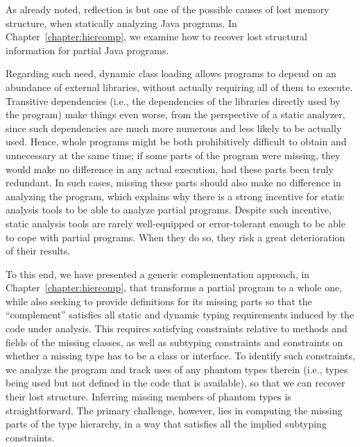 As already noted, reflection is but one of the possible causes of lost
memory structure, when statically analyzing Java programs. In
Chapter~\ref{chapter:hiercomp}, we examine how to recover lost
structural information for partial Java programs.


Regarding such need, dynamic class loading allows programs to depend
on an abundance of external libraries, without actually requiring all
of them to execute. Transitive dependencies (i.e., the dependencies of
the libraries directly used by the program) make things even worse,
from the perspective of a static analyzer, since such dependencies are
much more numerous and less likely to be actually used. Hence, whole
programs might be both prohibitively difficult to obtain and
unnecessary at the same time; if some parts of the program were
missing, they would make no difference in any actual execution, had
these parts been truly redundant. In such cases, missing these parts
should also make no difference in analyzing the program, which
explains why there is a strong incentive for static analysis tools to
be able to analyze partial programs. Despite such incentive, static
analysis tools are rarely well-equipped or error-tolerant enough to be
able to cope with partial programs. When they do so, they risk a great
deterioration of their results.

To this end, we have presented a generic complementation approach, in
Chapter~\ref{chapter:hiercomp}, that transforms a partial program to a
whole one, while also seeking to provide definitions for its missing
parts so that the ``complement'' satisfies all static and dynamic
typing requirements induced by the code under analysis. This requires
satisfying constraints relative to methods and fields of the missing
classes, as well as subtyping constraints and constraints on whether a
missing type has to be a class or interface.
%
To identify such constraints, we analyze the program and track uses
of any phantom types therein (i.e., types being used but not defined
in the code that is available), so that we can recover their
lost structure. Inferring missing members of phantom types is
straightforward. The primary challenge, however, lies in computing the
missing parts of the type hierarchy, in a way that satisfies all the
implied subtyping constraints.

